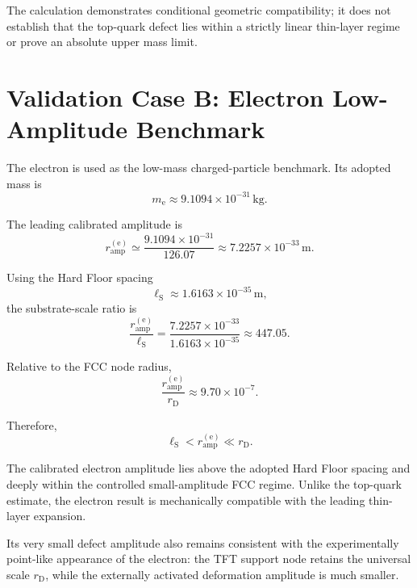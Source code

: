 The calculation demonstrates conditional geometric compatibility; it does not establish that the top-quark defect lies within a strictly linear thin-layer regime or prove an absolute upper mass limit.

\section{Validation Case B: Electron Low-Amplitude Benchmark}

The electron is used as the low-mass charged-particle benchmark. Its adopted mass is
\begin{equation}
    m_{\mathrm{e}} \approx 9.1094\times10^{-31}\,\mathrm{kg}.
\end{equation}

The leading calibrated amplitude is
\begin{equation}
    r_{\mathrm{amp}}^{(\mathrm{e})} \simeq \frac{ 9.1094\times10^{-31} }{ 126.07 } \approx 7.2257\times10^{-33}\,\mathrm{m}.
\end{equation}

Using the Hard Floor spacing
\begin{equation}
    \ell_{\mathrm{S}} \approx 1.6163\times10^{-35}\,\mathrm{m},
\end{equation}
the substrate-scale ratio is
\begin{equation}
    \frac{ r_{\mathrm{amp}}^{(\mathrm{e})} }{ \ell_{\mathrm{S}} } = \frac{ 7.2257\times10^{-33} }{ 1.6163\times10^{-35} } \approx 447.05.
\end{equation}

Relative to the FCC node radius,
\begin{equation}
    \frac{ r_{\mathrm{amp}}^{(\mathrm{e})} }{ r_{\mathrm{D}} } \approx 9.70\times10^{-7}.
\end{equation}

Therefore,
\begin{equation}
    \ell_{\mathrm{S}} < r_{\mathrm{amp}}^{(\mathrm{e})} \ll r_{\mathrm{D}}.
\end{equation}

The calibrated electron amplitude lies above the adopted Hard Floor spacing and deeply within the controlled small-amplitude FCC regime. Unlike the top-quark estimate, the electron result is mechanically compatible with the leading thin-layer expansion.

Its very small defect amplitude also remains consistent with the experimentally point-like appearance of the electron: the TFT support node retains the universal scale $r_{\mathrm{D}}$, while the externally activated deformation amplitude is much smaller.

